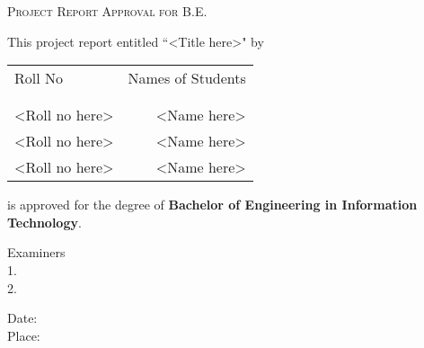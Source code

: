\newpage
\thispagestyle{empty}

\begin{center}
    \Large \textsc {Project Report Approval for B.E.}\\[0.5cm]
\end{center}

\normalsize This project report entitled ``<Title here>" by\\
\begin{table}[h]
    \centering
    \begin{tabular}{lr}
        Roll No        & Names of Students \\ \\ \hline
        \\
        <Roll no here> & <Name here>       \\
        <Roll no here> & <Name here>       \\
        <Roll no here> & <Name here>       \\
    \end{tabular}
\end{table}


\noindent \normalsize is approved for the degree of \textbf{Bachelor of Engineering in Information Technology}.
\vspace{.4in}

\begin{flushright}
    Examiners \\[0.5cm]
    1. \underline{\hspace{3cm}}\\[0.5cm]
    2. \underline{\hspace{3cm}}\\[0.5cm]
\end{flushright}

\begin{flushleft}
    Date:\\[0.5cm]
    Place:\\[0.5cm]
\end{flushleft}
